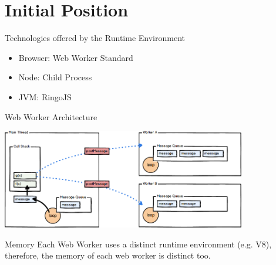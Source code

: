\section{Initial Position}

\begin{frame}{Technologies offered by the Runtime Environment}
	\begin{itemize}
		\item Browser: Web Worker Standard~\cite{w3cWebWorker}
		\item Node: Child Process~\cite{childProcess}
		\item JVM: RingoJS~\cite{RingoJS}
	\end{itemize}
\end{frame}

\begin{frame}{Web Worker Architecture}
	\begin{center}
		\includegraphics[width=0.8\textwidth]{web-workers}~\cite{Swenson-Healey2013}
	\end{center}
	
	\begin{alertblock}{Memory}
		Each Web Worker uses a distinct runtime environment (e.g. V8), therefore, the memory of each web worker is distinct too.
	\end{alertblock}

\end{frame}

